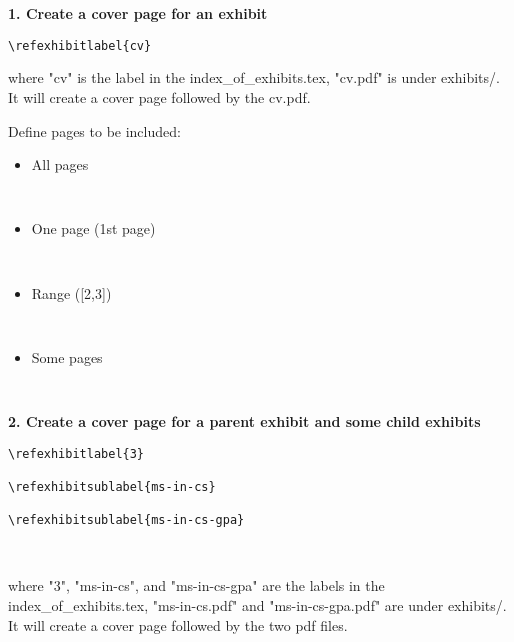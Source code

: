 
\section{}

\vspace{5mm}
\textbf{1. Create a cover page for an exhibit}
\begin{verbatim}
\refexhibitlabel{cv}

\end{verbatim}
where "cv" is the label in the index\_of\_exhibits.tex, "cv.pdf" is under exhibits/. It will create a cover page followed by the cv.pdf.

Define pages to be included:

\begin{itemize}
    \item All pages
        \begin{verbatim}
        
        \end{verbatim}
    \item One page (1st page)
        \begin{verbatim}
        
        \end{verbatim}
    \item Range ([2,3])
        \begin{verbatim}
        
        \end{verbatim}
    \item Some pages
        \begin{verbatim}
        
        \end{verbatim}    
\end{itemize}

\vspace{5mm}
\textbf{2. Create a cover page for a parent exhibit and some child exhibits}
\begin{verbatim}
\refexhibitlabel{3}

\refexhibitsublabel{ms-in-cs}

\refexhibitsublabel{ms-in-cs-gpa}



\end{verbatim}
where "3", "ms-in-cs", and "ms-in-cs-gpa" are the labels in the index\_of\_exhibits.tex, "ms-in-cs.pdf" and "ms-in-cs-gpa.pdf" are under exhibits/. It will create a cover page followed by the two pdf files. 

